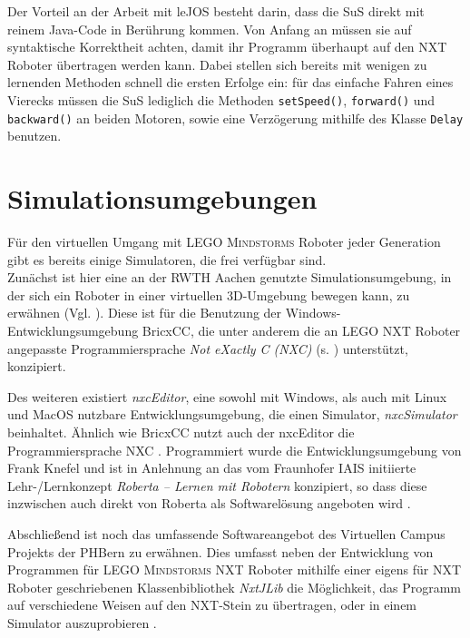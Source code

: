 \documentclass[paper=a4, pagesize, DIV=calc, BCOR=15.5mm, twoside=on, onecolumn=on, open = right, titlepage =on, parskip =half-, headsepline = on, footsepline = on, chapterprefix = on, appendixprefix = off, fontsize = 12pt, numbers = noenddot, abstract = on]{scrbook}
\numberwithin{equation}{chapter}
\theoremstyle{definition}
\theoremstyle{plain}
\theoremstyle{plain}
\theoremstyle{remark}
\theoremstyle{plain}
\theoremstyle{plain}
\begin{document}
Der Vorteil an der Arbeit mit leJOS besteht darin, dass die SuS direkt mit reinem Java-Code in Berührung kommen. Von Anfang an müssen sie auf syntaktische Korrektheit achten, damit ihr Programm überhaupt auf den NXT Roboter übertragen werden kann. Dabei stellen sich bereits mit wenigen zu lernenden Methoden schnell die ersten Erfolge ein: für das einfache Fahren eines Vierecks müssen die SuS lediglich die  Methoden \texttt{setSpeed()}, \texttt{forward()} und \texttt{backward()} an beiden Motoren, sowie eine Verzögerung mithilfe des Klasse \texttt{Delay} benutzen. 



\par \singlespacing
\section{Simulationsumgebungen}
\label{sec:simulationsumgebungen}
\onehalfspacing
Für den virtuellen Umgang mit \textsc{LEGO Mindstorms} Roboter jeder Generation gibt es bereits einige Simulatoren, die frei verfügbar sind.\\
Zunächst ist hier eine an der RWTH Aachen genutzte Simulationsumgebung, in der sich ein Roboter in einer virtuellen 3D-Umgebung bewegen kann, zu erwähnen (Vgl. \cite{rwth}). Diese ist für die Benutzung der Windows-Entwicklungsumgebung BricxCC, die unter anderem die an \textsc{LEGO} NXT Roboter angepasste Programmiersprache \emph{Not eXactly C (NXC)} (s. \cite{bricxcc}) unterstützt, konzipiert.

Des weiteren existiert \emph{nxcEditor}, eine sowohl mit Windows, als auch mit Linux und MacOS nutzbare Entwicklungsumgebung, die einen Simulator, \emph{nxcSimulator} beinhaltet. Ähnlich wie BricxCC nutzt auch der nxcEditor die Programmiersprache NXC \cite{nxceditor}. Programmiert wurde die Entwicklungsumgebung von Frank Knefel und ist in Anlehnung an das vom Fraunhofer IAIS initiierte Lehr-/Lernkonzept \emph{Roberta -- Lernen mit Robotern} konzipiert, so dass diese inzwischen auch direkt von Roberta als Softwarelösung angeboten wird \cite{roberta}.

Abschließend ist noch das umfassende Softwareangebot des Virtuellen Campus Projekts der PHBern zu erwähnen. Dies umfasst neben der Entwicklung von Programmen für \textsc{LEGO Mindstorms} NXT Roboter mithilfe einer eigens für NXT Roboter geschriebenen Klassenbibliothek \emph{NxtJLib} \cite{aegidius:16} die Möglichkeit, das Programm auf verschiedene Weisen auf den NXT-Stein zu übertragen, oder in einem Simulator auszuprobieren \cite{phbern}. 
\end{document}
